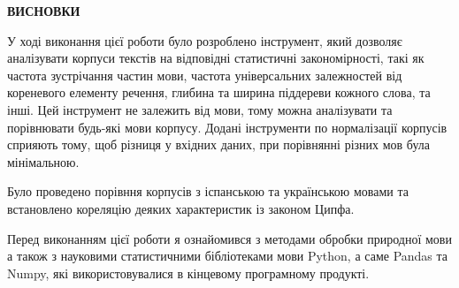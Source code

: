 {}

\begin{center}
\textbf{\Large ВИСНОВКИ}
\end{center}

У ході виконання цієї роботи було розроблено інструмент, який дозволяє аналізувати
корпуси текстів на відповідні статистичні закономірності, такі як частота зустрічання
частин мови, частота універсальних залежностей від кореневого елементу речення, глибина
та ширина піддереви кожного слова, та інші.
Цей інструмент не залежить від мови, тому можна аналізувати та порівнювати будь-які мови
корпусу. Додані інструменти по нормалізації корпусів сприяють тому, щоб різниця
у вхідних даних, при порівнянні різних мов була мінімальною.

Було проведено порівння корпусів з іспанською та українською мовами та встановлено кореляцію
деяких характеристик із законом Ципфа.

Перед виконанням цієї роботи я ознайомився з методами обробки природної мови
а також з науковими статистичними бібліотеками мови Python, а саме Pandas та Numpy, які використовувалися
в кінцевому програмному продукті.
